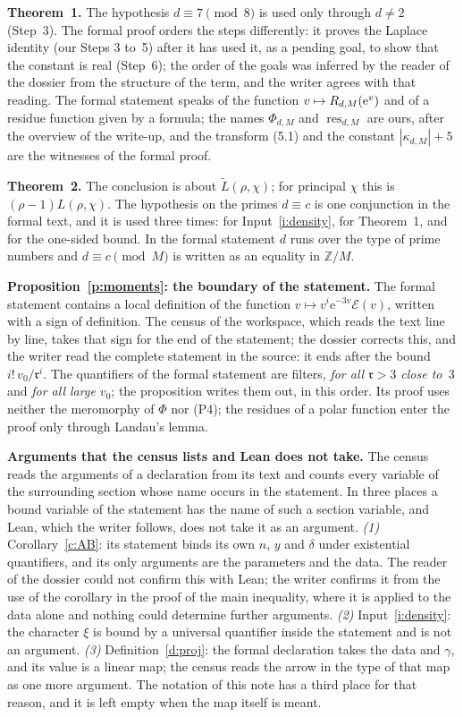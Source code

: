 \documentclass[11pt,a4paper]{article}
\newcommand{\Z}{\mathbb{Z}}
\newcommand{\subhead}[1]{\par\addvspace{9pt plus 2pt}\Needspace{4\baselineskip}\noindent\textbf{#1}\enspace\ignorespaces}
\theoremstyle{plainx}
\theoremstyle{uprightx}
\newcommand{\ee}{\mathrm{e}}
\newcommand{\Ltv}[2]{\tilde L(#1,#2)}
\newcommand{\kap}[2]{\kappa_{#1,#2}}
\newcommand{\cE}{\mathcal{E}}
\newcommand{\rr}{\mathfrak{r}}
\begin{document}
\subhead{Theorem~1.} The hypothesis $d\equiv7\pmod 8$ is used only through $d\ne2$ (Step~3). The formal proof
orders the steps differently: it proves the Laplace identity (our Steps 3 to~5) after it has used it, as a pending
goal, to show that the constant is real (Step~6); the order of the goals was inferred by the reader of the
dossier from the structure of the term, and the writer agrees with that reading. The formal statement speaks of
the function $v\mapsto\primeError{d}{M}{\ee^{v}}$ and of a residue function given by a formula; the names
$\Phi_{d,M}$ and $\operatorname{res}_{d,M}$ are ours, after the overview of the write-up, and the transform (5.1)
and the constant $|\kap{d}{M}|+5$ are the witnesses of the formal proof.

\subhead{Theorem~2.} The conclusion is about $\Ltv{\rho}{\chi}$; for principal $\chi$ this is
$(\rho-1)L(\rho,\chi)$. The hypothesis on the primes $d\equiv c$ is one conjunction in the formal text, and it is
used three times: for Input~\ref{i:density}, for Theorem~1, and for the one-sided bound. In the formal statement
$d$ runs over the type of prime numbers and $d\equiv c\pmod M$ is written as an equality in $\Z/M$.

\subhead{Proposition~\ref{p:moments}: the boundary of the statement.} The formal statement contains a local
definition of the function $v\mapsto v^{i}\ee^{-3v}\cE(v)$, written with a sign of definition. The census of the
workspace, which reads the text line by line, takes that sign for the end of the statement; the dossier corrects
this, and the writer read the complete statement in the source: it ends after the bound $i!\,v_0/\rr^{i}$. The
quantifiers of the formal statement are filters, \emph{for all $\rr>3$ close to~$3$} and \emph{for all large
$v_0$}; the proposition writes them out, in this order. Its proof uses neither the meromorphy of $\Phi$ nor (P4);
the residues of a polar function enter the proof only through Landau's lemma.

\subhead{Arguments that the census lists and Lean does not take.} The census reads the arguments of a declaration
from its text and counts every variable of the surrounding section whose name occurs in the statement. In three
places a bound variable of the statement has the name of such a section variable, and Lean, which the writer follows,
does not take it as an argument. \emph{(1)} Corollary~\ref{c:AB}: its statement binds its own $n$, $y$ and $\delta$
under existential quantifiers, and its only arguments are the parameters and the data. The reader of the dossier
could not confirm this with Lean; the writer confirms it from the use of the corollary in the proof of the main
inequality, where it is applied to the data alone and nothing could determine further arguments. \emph{(2)}
Input~\ref{i:density}: the character $\xi$ is bound by a universal quantifier inside the statement and is not an
argument. \emph{(3)} Definition~\ref{d:proj}: the formal declaration takes the data and $\gamma$, and its value is a
linear map; the census reads the arrow in the type of that map as one more argument. The notation of this note has
a third place for that reason, and it is left empty when the map itself is meant.
\end{document}
